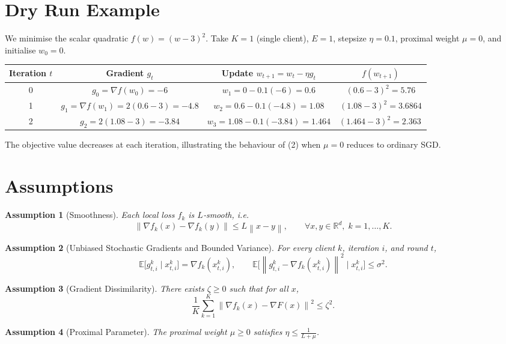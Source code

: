 \documentclass{article}
\newtheorem{assumption}{Assumption}
\newcommand{\EE}{\mathbb{E}}
\newcommand{\RR}{\mathbb{R}}
\newcommand{\norm}[1]{\left\|#1\right\|}
\begin{document}
\section*{Dry Run Example}
We minimise the scalar quadratic $f(w)=(w-3)^{2}$.
Take $K=1$ (single client), $E=1$, stepsize $\eta=0.1$, proximal weight $\mu=0$,
and initialise $w_{0}=0$.

\begin{center}
\begin{tabular}{c|c|c|c}
Iteration $t$ & Gradient $g_t$ & Update $w_{t+1}=w_t-\eta g_t$ & $f(w_{t+1})$\\\hline
0 & $g_0=\nabla f(w_0)= -6$ & $w_1=0-0.1(-6)=0.6$ & $(0.6-3)^2=5.76$\\
1 & $g_1=\nabla f(w_1)=2(0.6-3)=-4.8$ & $w_2=0.6-0.1(-4.8)=1.08$ & $(1.08-3)^2=3.6864$\\
2 & $g_2=2(1.08-3)=-3.84$ & $w_3=1.08-0.1(-3.84)=1.464$ & $(1.464-3)^2=2.363\,$\\
\end{tabular}
\end{center}
The objective value decreases at each iteration, illustrating the
behaviour of (2) when $\mu=0$ reduces to ordinary SGD.

\newpage
\section*{Assumptions}
\begin{assumption}[Smoothness]\label{as:smooth}
Each local loss $f_k$ is $L$‑smooth, i.e.
\[
\norm{\nabla f_k(x)-\nabla f_k(y)}\le L\norm{x-y},
\qquad\forall x,y\in\RR^{d},\;k=1,\dots ,K.
\]
\end{assumption}
\begin{assumption}[Unbiased Stochastic Gradients and Bounded Variance]\label{as:unbiased}
For every client $k$, iteration $i$, and round $t$,
\[
\EE\!\big[g_{t,i}^{k}\mid x_{t,i}^{k}\big]=\nabla f_k(x_{t,i}^{k}),\qquad
\EE\!\big[\norm{g_{t,i}^{k}-\nabla f_k(x_{t,i}^{k})}^{2}\mid x_{t,i}^{k}\big]\le\sigma^{2}.
\]
\end{assumption}
\begin{assumption}[Gradient Dissimilarity]\label{as:dissimilarity}
There exists $\zeta\ge0$ such that for all $x$,
\[
\frac1K\sum_{k=1}^{K}\norm{\nabla f_k(x)-\nabla F(x)}^{2}\le\zeta^{2}.
\]
\end{assumption}
\begin{assumption}[Proximal Parameter]\label{as:mu}
The proximal weight $\mu\ge0$ satisfies $\eta\le\frac{1}{L+\mu}$.
\end{assumption}
\end{document}
